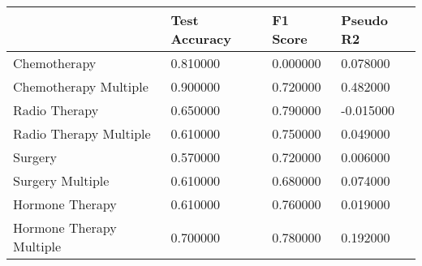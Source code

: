 \begin{tabular}{llll}
\toprule
 & Test Accuracy & F1 Score & Pseudo R2 \\
\midrule
Chemotherapy & 0.810000 & 0.000000 & 0.078000 \\
Chemotherapy Multiple & 0.900000 & 0.720000 & 0.482000 \\
Radio Therapy & 0.650000 & 0.790000 & -0.015000 \\
Radio Therapy Multiple & 0.610000 & 0.750000 & 0.049000 \\
Surgery & 0.570000 & 0.720000 & 0.006000 \\
Surgery Multiple & 0.610000 & 0.680000 & 0.074000 \\
Hormone Therapy & 0.610000 & 0.760000 & 0.019000 \\
Hormone Therapy Multiple & 0.700000 & 0.780000 & 0.192000 \\
\bottomrule
\end{tabular}
